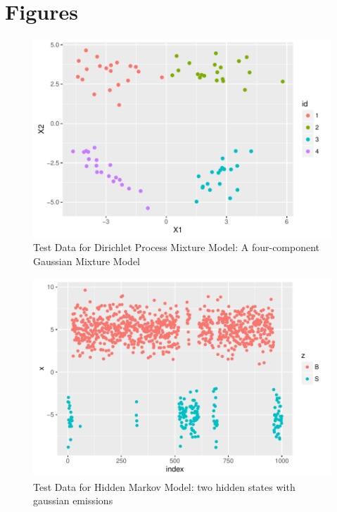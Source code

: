 \documentclass[12pt]{article}
\begin{document}
\newpage

\section*{Figures}

\begin{figure}
\centering
\includegraphics{plots/gmm.pdf}
\caption{Test Data for Dirichlet Process Mixture Model: A four-component Gaussian Mixture Model}
\end{figure}

\begin{figure}
\centering
\includegraphics{plots/hmm.pdf}
\caption{Test Data for Hidden Markov Model: two hidden states with gaussian emissions}
\end{figure}
\end{document}
